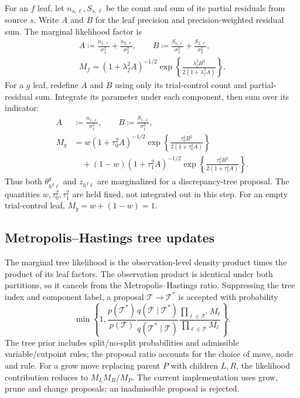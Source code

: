 For an $f$ leaf, let $n_{s,\ell},S_{s,\ell}$ be the count and sum of its partial residuals from source $s$. Write $A$ and $B$ for the leaf precision and precision-weighted residual sum. The marginal likelihood factor is
\begin{equation}\label{eq:Mf}
\begin{gathered}
A\coloneqq \frac{n_{1,\ell}}{\sigma_1^2}+\frac{n_{2,\ell}}{\sigma_2^2},\qquad
B\coloneqq \frac{S_{1,\ell}}{\sigma_{1}^2}+\frac{S_{2,\ell}}{\sigma_{2}^2},\\
M_f=(1+\lambda_f^2A)^{-1/2}
\exp\!\left\{\frac{\lambda_f^2B^2}{2(1+\lambda_f^2A)}\right\}.
\end{gathered}
\end{equation}
For a $g$ leaf, redefine $A$ and $B$ using only its trial-control count and partial-residual sum. Integrate its parameter under each component, then sum over its indicator:
\begin{equation}\label{eq:Mg}
\begin{aligned}
A&\coloneqq \frac{n_{1,\ell}}{\sigma_1^2},\qquad B\coloneqq \frac{S_{1,\ell}}{\sigma_1^2},\\
M_g&=w(1+\tau_0^2A)^{-1/2}
\exp\!\left\{\frac{\tau_0^2B^2}{2(1+\tau_0^2A)}\right\}\\
&\quad+(1-w)(1+\tau_1^2A)^{-1/2}
\exp\!\left\{\frac{\tau_1^2B^2}{2(1+\tau_1^2A)}\right\}.
\end{aligned}
\end{equation}
Thus both $\theta^g_{h^g\ell}$ and $z_{h^g\ell}$ are marginalized for a discrepancy-tree proposal. The quantities $w,\tau_0^2,\tau_1^2$ are held fixed, not integrated out in this step. For an empty trial-control leaf, $M_g=w+(1-w)=1$.

\subsection{Metropolis--Hastings tree updates}\label{sec:A.4}
The marginal tree likelihood is the observation-level density product times the product of its leaf factors. The observation product is identical under both partitions, so it cancels from the Metropolis--Hastings ratio. Suppressing the tree index and component label, a proposal $\mathcal T\to \mathcal T^*$ is accepted with probability
\begin{equation}\label{eq:MH}
\min\left\{1,
\frac{p(\mathcal T^*)}{p(\mathcal T)}\frac{q(\mathcal T\mid \mathcal T^*)}{q(\mathcal T^*\mid \mathcal T)}
\frac{\prod_{\ell\in \mathcal T^*}M_\ell}{\prod_{\ell\in \mathcal T}M_\ell}\right\}.
\end{equation}
The tree prior includes split/no-split probabilities and admissible variable/cutpoint rules; the proposal ratio accounts for the choice of move, node and rule. For a grow move replacing parent $P$ with children $L,R$, the likelihood contribution reduces to $M_LM_R/M_P$. The current implementation uses grow, prune and change proposals; an inadmissible proposal is rejected.

